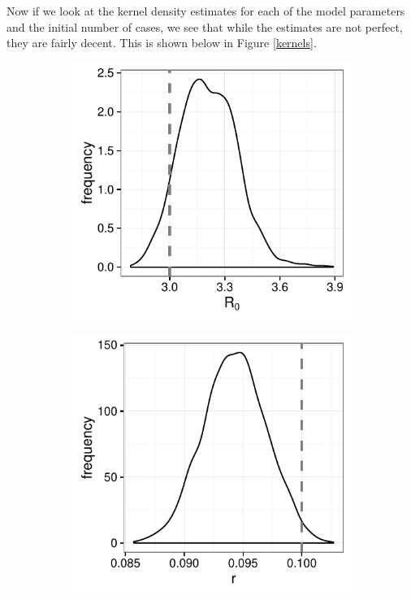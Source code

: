     Now if we look at the kernel density estimates for each of the model parameters and the initial number of cases, we see that while the estimates are not perfect, they are fairly decent. This is shown below in Figure \ref{kernels}.

    \begin{figure}[H]
    \centering
        \begin{subfigure}[tl]{0.49\textwidth}
            \includegraphics[width=\textwidth]{./images/kernelR0.pdf}
        \end{subfigure}
        \begin{subfigure}[tr]{0.49\textwidth}
            \includegraphics[width=\textwidth]{./images/kernelr.pdf}

\end{subfigure}
\end{figure}
